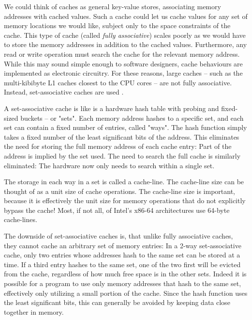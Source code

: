 We could think of caches as general key-value stores, associating memory
addresses with cached values. Such a cache could let us cache values for any
set of memory locations we would like, subject only to the space constraints of
the cache. This type of cache (called \textit{fully associative}) scales
poorly as we would have to store the memory addresses in addition to the cached
values. Furthermore, any read or write operation must search the cache for the
relevant memory address. While this may sound simple enough to software
designers, cache behaviours are implemented as electronic circuitry. For these
reasons, large caches -- such as the multi-kibibyte L1 caches closest to the CPU
cores -- are not fully associative. Instead, set-associative caches are used
\cite{whatprogrammersshouldknow} \cite{mckenny-barriers}.

A set-associative cache is like is a hardware hash table with probing and
fixed-sized buckets -- or "sets". Each memory address hashes to a specific set,
and each set can contain a fixed number of entries, called "ways". The hash
function simply takes a fixed number of the least significant bits of the
address. This eliminates the need for storing the full memory address of each
cache entry: Part of the address is implied by the set used. The need to search
the full cache is similarly eliminated: The hardware now only needs to search
within a single set.

The storage in each way in a set is called a cache-line. The cache-line
size can be thought of as a unit size of cache operations. The cache-line size
is important, because it is effectively the unit size for memory operations that
do not explicitly bypass the cache! Most, if not all, of
Intel's x86-64 architectures use 64-byte cache-lines\cite{inteloptimize}.

The downside of set-associative caches is, that unlike fully associative
caches, they cannot cache an arbitrary set of memory entries: In a 2-way
set-associative cache, only two entries whose addresses hash to the same set can
be stored at a time. If a third entry hashes to the same set, one of the two
first will be evicted from the cache, regardless of how much free space is in
the other sets. Indeed it is possible for a program to use only memory
addresses that hash to the same set, effectively only utilizing a small portion
of the cache. Since the hash function uses the least significant bits, this can
generally be avoided by keeping data close together in memory. 

